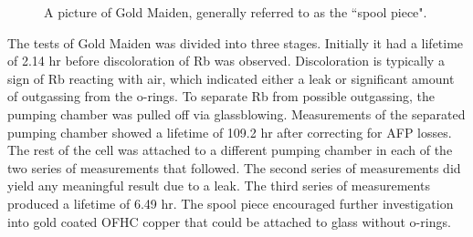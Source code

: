 \begin{figure}[t!]
	\centering
	\caption{{A picture of Gold Maiden, generally referred to as the ``spool piece". }}
	\label{spool_piece}
\end{figure}

The tests of Gold Maiden was divided into three stages. Initially it had a lifetime of 2.14 hr before discoloration of Rb was observed. Discoloration is typically a sign of Rb reacting with air, which indicated either a leak or significant amount of outgassing from the o-rings. To separate Rb from possible outgassing, the pumping chamber was pulled off via glassblowing. Measurements of the separated pumping chamber showed a lifetime of 109.2 hr after correcting for AFP losses. The rest of the cell was attached to a different pumping chamber in each of the two series of measurements that followed. The second series of measurements did yield any meaningful result due to a leak. The third series of measurements  produced a lifetime of 6.49 hr. The spool piece encouraged further investigation into gold coated OFHC copper that could be attached to glass without o-rings.


